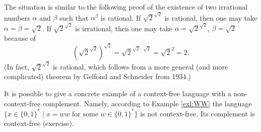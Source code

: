 \begin{page}

\begin{rem}
The situation is similar to the following proof of the existence of two irrational numbers $\alpha$ and $\beta$ such that $\alpha^\beta$ is rational.
If $\sqrt{2}^{\sqrt{2}}$ is rational, then one may take $\alpha = \beta = \sqrt{2}$.
If $\sqrt{2}^{\sqrt{2}}$ is irrational, then one may take $\alpha = \sqrt{2}^{\sqrt{2}}$, $\beta = \sqrt{2}$ because of
\[
\left(\sqrt{2}^{\sqrt{2}}\right)^{\sqrt{2}} = \sqrt{2}^{\sqrt{2} \cdot \sqrt{2}} = \sqrt{2}^2 = 2.
\]
(In fact, $\sqrt{2}^{\sqrt{2}}$ is rational, which follows from a more general (and more complicated) theorem by Gelfond and Schneider from 1934.)
\end{rem}

\end{page}

\begin{page}


It is possible to give a concrete example of a context-free language with a non-context-free complement.
Namely, according to Example \ref{exl:WW} the language $\{x \in \{0,1\}^* \mid x = ww \text{ for some } w \in \{0,1\}^*\}$
is not context-free. Its complement is context-free (exercise).












\end{page}

